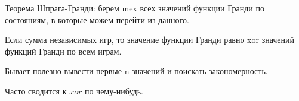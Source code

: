 Теорема Шпрага-Гранди: берем mex всех значений функции Гранди по состояниям, в которые можем перейти из данного.

Если сумма независимых игр, то значение функции Гранди равно xor значений функций Гранди по всем играм.

Бывает полезно вывести первые n значений и поискать закономерность.

Часто сводится к $xor$ по чему-нибудь.
